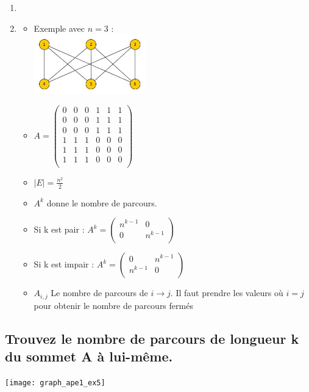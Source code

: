 \begin{solution}
\begin{enumerate}
\item
\item
	\begin{itemize}
	\item Exemple avec $n=3$ :\\
	\includegraphics[width=0.4\textwidth]{graph_ape1_ex4}
	\item 
	 $A = \begin{pmatrix}
	 0&0&0&1&1&1\\
	 0&0&0&1&1&1\\
	 0&0&0&1&1&1\\
	 1&1&1&0&0&0\\
	 1&1&1&0&0&0\\
	 1&1&1&0&0&0\\
	 \end{pmatrix}$

	\item $|E| = \frac{n^{2}}{2}$
		
	\item $A^{k} $ donne le nombre de parcours.
	\item Si k est pair :
	 $A^{k} =  \left(
	 \begin{array}{c|c}
	 n^{k-1} & 0\\
	 \hline
	 0 & n^{k-1}\\
	 \end{array}
	 \right)
	 $
	\item Si k est impair :
	 $A^{k} =  \left(
	 \begin{array}{c|c}
	 0 & n^{k-1}\\
	 \hline
	 n^{k-1}&0\\
	 \end{array}
	 \right)
	 $
	\item $A_{i,j}$ Le nombre de parcours de $i \rightarrow j$. Il faut prendre les valeurs où $i = j$ pour obtenir le nombre de parcours fermés
\end{itemize}
\end{enumerate}
\end{solution}

\subsection{Trouvez le nombre de parcours de longueur k du sommet A à lui-même.}
\texttt{[image: graph\_ape1\_ex5]}


